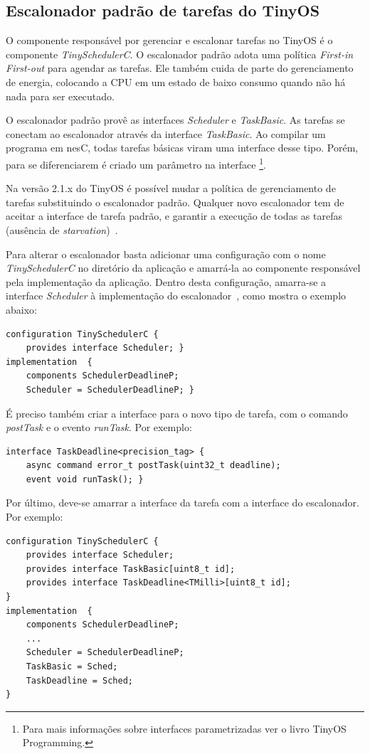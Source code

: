 \documentclass[a4paper, 10pt]{article}
\begin{document}
\subsection{Escalonador padrão de tarefas do TinyOS}\label{escalonadorpadrao}
O componente responsável por gerenciar e escalonar tarefas no TinyOS é o componente {\em TinySchedulerC}.
O escalonador padrão adota uma política {\em First-in First-out} para agendar as tarefas. Ele também
cuida de parte do gerenciamento de energia, colocando a CPU em um estado de baixo consumo quando
não há nada para ser executado.

O escalonador padrão provê as interfaces \textit{Scheduler} e \textit{TaskBasic}.
As tarefas se conectam ao escalonador através da interface \textit{TaskBasic}. 
Ao compilar um programa em nesC, todas tarefas
básicas viram uma interface desse tipo. Porém, para se diferenciarem é criado um parâmetro na interface
\footnote{Para mais informações sobre interfaces parametrizadas ver o livro 
TinyOS Programming\cite[s. 8.3 e 9]{LevisGay/09}.}.

Na versão 2.1.x do TinyOS é possível mudar a política de gerenciamento de tarefas substituindo 
o escalonador padrão. Qualquer novo escalonador tem de
aceitar a interface de tarefa padrão, e garantir a execução de todas as tarefas 
(ausência de {\em starvation})~\cite{TEP106}.

Para alterar o escalonador basta adicionar uma configuração com o nome {\em TinySchedulerC} 
no diretório da aplicação e amarrá-la ao componente responsável pela implementação da aplicação. 
Dentro desta configuração, amarra-se a interface \textit{Scheduler} 
à implementação do escalonador~\cite{TEP106}, como mostra o exemplo abaixo:

\begin{lstlisting}
configuration TinySchedulerC {
    provides interface Scheduler; }
implementation  {
    components SchedulerDeadlineP;
    Scheduler = SchedulerDeadlineP; }
\end{lstlisting}

É preciso também criar a interface para o novo tipo de tarefa, com o comando \textit{postTask} e o evento
\textit{runTask}. Por exemplo:
\begin{lstlisting}
interface TaskDeadline<precision_tag> { 
    async command error_t postTask(uint32_t deadline);
    event void runTask(); }
\end{lstlisting}

Por último, deve-se amarrar a interface da tarefa com a interface do escalonador. Por exemplo:
\begin{lstlisting}
configuration TinySchedulerC {
    provides interface Scheduler;
    provides interface TaskBasic[uint8_t id];
    provides interface TaskDeadline<TMilli>[uint8_t id];
}
implementation  {
    components SchedulerDeadlineP;
    ...
    Scheduler = SchedulerDeadlineP;
    TaskBasic = Sched; 
    TaskDeadline = Sched;
}
\end{lstlisting}
\end{document}
